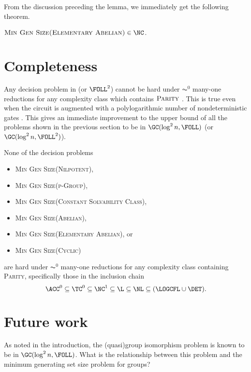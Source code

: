 \documentclass{article}
\begin{document}
From the discussion preceding the lemma, we immediately get the following theorem.

\begin{theorem}\label{thm:eainnc}
  $\textsc{Min Gen Size(Elementary Abelian)} \in \NC$.
\end{theorem}

\section{Completeness}

Any decision problem in \FOLL{} (or $\FOLL^2$) cannot be hard under $\AC^0$ many-one reductions for any complexity class which contains $\textsc{Parity}$ \cite[Section~2.2]{bklm01}.
This is true even when the circuit is augmented with a polylogarithmic number of nondeterministic gates \cite[Section~4]{ctw10}.
This gives an immediate improvement to the upper bound of all the problems shown in the previous section to be in $\GC(\log^2 n, \FOLL)$ (or $\GC(\log^2 n, \FOLL^2)$).

\begin{theorem}
  None of the decision problems
  \begin{itemize}
  \item \textsc{Min Gen Size(Nilpotent)},
  \item \textsc{Min Gen Size(p-Group)},
  \item \textsc{Min Gen Size(Constant Solvability Class)},
  \item \textsc{Min Gen Size(Abelian)},
  \item \textsc{Min Gen Size(Elementary Abelian)}, or
  \item \textsc{Min Gen Size(Cyclic)}
  \end{itemize}
  are hard under $\AC^0$ many-one reductions for any complexity class containing \textsc{Parity}, specifically those in the inclusion chain
  \begin{equation*}
    \ACC^0 \subseteq \TC^0 \subseteq \NC^1 \subseteq \L \subseteq \NL \subseteq (\LOGCFL \cup \DET).
  \end{equation*}
\end{theorem}

\section{Future work}

As noted in the introduction, the (quasi)group isomorphism problem is known to be in $\GC(\log^2 n, \FOLL)$.
What is the relationship between this problem and the minimum generating set size problem for groups?
\end{document}
